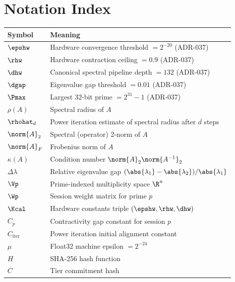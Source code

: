 \documentclass[12pt,letterpaper]{article}
\theoremstyle{plain}
\theoremstyle{definition}
\theoremstyle{remark}
\begin{document}
\section*{Notation Index}

\begin{table}[H]
\centering
\begin{tabular}{ll}
\toprule
\textbf{Symbol} & \textbf{Meaning} \\
\midrule
\(\epshw\) & Hardware convergence threshold \(= 2^{-20}\) (ADR-037) \\
\(\rhw\) & Hardware contraction ceiling \(= 0.9\) (ADR-037) \\
\(\dhw\) & Canonical spectral pipeline depth \(= 132\) (ADR-037) \\
\(\dgap\) & Eigenvalue gap threshold \(= 0.01\) (ADR-037) \\
\(\Pmax\) & Largest 32-bit prime \(= 2^{31}-1\) (ADR-037) \\
\(\rho(A)\) & Spectral radius of \(A\) \\
\(\rhohat_d\) & Power iteration estimate of spectral radius after \(d\) steps \\
\(\norm{A}_2\) & Spectral (operator) 2-norm of \(A\) \\
\(\norm{A}_F\) & Frobenius norm of \(A\) \\
\(\kappa(A)\) & Condition number \(\norm{A}_2 \norm{A^{-1}}_2\) \\
\(\Delta\lambda\) & Relative eigenvalue gap \((\abs{\lambda_1}-\abs{\lambda_2})/\abs{\lambda_1}\) \\
\(\Vp\) & Prime-indexed multiplicity space \(\R^n\) \\
\(\Wp\) & Session weight matrix for prime \(p\) \\
\(\Kcal\) & Hardware constants triple \((\epshw,\rhw,\dhw)\) \\
\(C_p\) & Contractivity gap constant for session \(p\) \\
\(C_{\mathrm{iter}}\) & Power iteration initial alignment constant \\
\(\mu\) & Float32 machine epsilon \(= 2^{-24}\) \\
\(H\) & SHA-256 hash function \\
\(C\) & Tier commitment hash \\
\bottomrule
\end{tabular}
\end{table}


\nocite{*}
  

\end{document}
